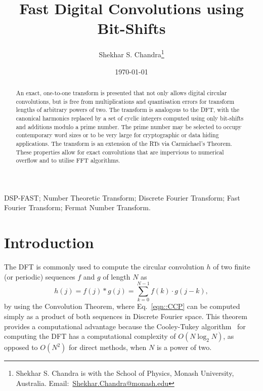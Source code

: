 \documentclass[twocolumn]{IEEEtran}
\title{Fast Digital Convolutions using Bit-Shifts}
\author{Shekhar S. Chandra\thanks{Shekhar S. Chandra is with the School of Physics, Monash University, Australia. Email:~\href{mailto:Shekhar.Chandra@monash.edu}{Shekhar.Chandra@monash.edu}}}
\date{\today}
\newcommand{\firstIndex}{j}
\newcommand{\secondIndex}{k}
\newcommand{\eqnTag}{Eq.}
\begin{document}
\maketitle
\acresetall

\begin{abstract}
An exact, one-to-one transform is presented that not only allows digital circular convolutions, but is free from multiplications and quantisation errors for transform lengths of arbitrary powers of two. The transform is analogous to the \acl{DFT}, with the canonical harmonics replaced by a set of cyclic integers computed using only bit-shifts and additions modulo a prime number. The prime number may be selected to occupy contemporary word sizes or to be very large for cryptographic or data hiding applications. The transform is an extension of the \aclp{RT} via Carmichael's Theorem. These properties allow for exact convolutions that are impervious to numerical overflow and to utilise \acl{FFT} algorithms.









\end{abstract}

\begin{IEEEkeywords}
DSP-FAST; Number Theoretic Transform; Discrete Fourier Transform; Fast Fourier Transform; Fermat Number Transform.
\end{IEEEkeywords}

\acresetall \section{Introduction}\label{sec::Intro}
The \ac{DFT} is commonly used to compute the circular convolution $h$ of two finite (or periodic) sequences $f$ and $g$ of length $N$ as
\begin{equation}\label{eqn::CCP}
 h(\firstIndex) = f(\firstIndex) * g(\firstIndex) = \sum^{N-1}_{\secondIndex=0} f(\secondIndex) \cdot g(\firstIndex-\secondIndex),
\end{equation}
by using the Convolution Theorem, where \eqnTag~\eqref{eqn::CCP} can be computed simply as a product of both sequences in Discrete Fourier space. This theorem provides a computational advantage because the Cooley-Tukey algorithm~\citep{Cooley1965} for computing the \ac{DFT} has a computational complexity of $O(N\log_2 N)$, as opposed to $O(N^2)$ for direct methods, when $N$ is a power of two.
\end{document}
